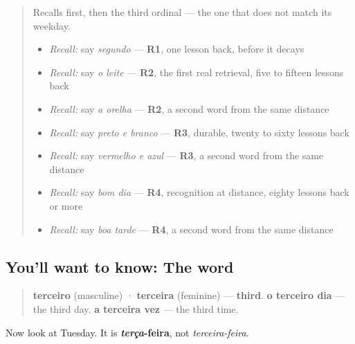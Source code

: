 \label{lesson:PT-C27-terceiro}



\begin{quote}
Recalls first, then the third ordinal — the one that does not match its weekday.

\begin{itemize}
\raggedright
  \item \emph{Recall:} say \emph{segundo} — \textbf{R1}, one lesson back, before it decays
  \item \emph{Recall:} say \emph{o leite} — \textbf{R2}, the first real retrieval, five to fifteen lessons back
  \item \emph{Recall:} say \emph{a orelha} — \textbf{R2}, a second word from the same distance
  \item \emph{Recall:} say \emph{preto e branco} — \textbf{R3}, durable, twenty to sixty lessons back
  \item \emph{Recall:} say \emph{vermelho e azul} — \textbf{R3}, a second word from the same distance
  \item \emph{Recall:} say \emph{bom dia} — \textbf{R4}, recognition at distance, eighty lessons back or more
  \item \emph{Recall:} say \emph{boa tarde} — \textbf{R4}, a second word from the same distance
\end{itemize}
\end{quote}

\subsection*{You'll want to know: The word}
\begin{quote}
\textbf{terceiro} (masculine) · \textbf{terceira} (feminine) — \textbf{third}. \textbf{o terceiro dia} — the third day. \textbf{a terceira vez} — the third time.
\end{quote}

Now look at Tuesday. It is \textbf{\emph{terça}-feira}, not \emph{terceira-feira}.

